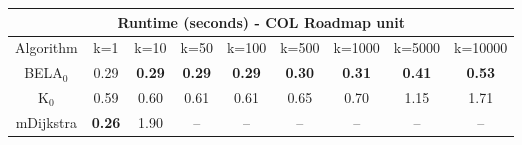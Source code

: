 \begin{tabular}{c|cccccccc}\toprule
\multicolumn{9}{c}{Runtime (seconds) - COL Roadmap unit}\\ \midrule
Algorithm & k=1 & k=10 & k=50 & k=100 & k=500 & k=1000 & k=5000 & k=10000 \\ \midrule
BELA$_0$ & 0.29 & \textbf{0.29} & \textbf{0.29} & \textbf{0.29} & \textbf{0.30} & \textbf{0.31} & \textbf{0.41} & \textbf{0.53} \\
K$_0$ & 0.59 & 0.60 & 0.61 & 0.61 & 0.65 & 0.70 & 1.15 & 1.71 \\
mDijkstra & \textbf{0.26} & 1.90 & -- & -- & -- & -- & -- & -- \\ \bottomrule 
\end{tabular}
